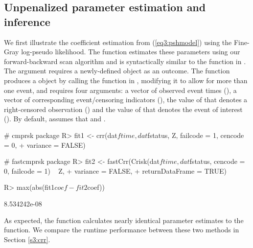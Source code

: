 \subsection{Unpenalized parameter estimation and inference}
We first illustrate the coefficient estimation from (\ref{eq3:pshmodel}) using the Fine-Gray log-pseudo likelihood. 
The  function estimates these parameters using our forward-backward scan algorithm and is syntactically similar to the  function in . The  argument requires a newly-defined  object as an outcome. The  function produces a  object by calling the  function in , modifying it to allow for more than one event, and requires four arguments: a vector of observed event times (), a vector of corresponding event/censoring indicators (), the value of  that denotes a right-censored observation () and the value of  that denotes the event of interest (). By default,  assumes that  and .
\begin{example}
# cmprsk package
R> fit1 <- crr(dat$ftime, dat$fstatus, Z, failcode = 1, cencode = 0,
+                      variance = FALSE)

# fastcmprsk package
R> fit2 <- fastCrr(Crisk(dat$ftime, dat$fstatus, cencode = 0, failcode = 1) ~ Z,
+                           variance = FALSE,
+                           returnDataFrame = TRUE)

R> max(abs(fit1$coef - fit2$coef))
\end{example}
\begin{example}
[1] 8.534242e-08
\end{example}
As expected, the  function calculates nearly identical parameter estimates to the  function. We compare the runtime performance between these two methods in Section \ref{s3:crr}.

